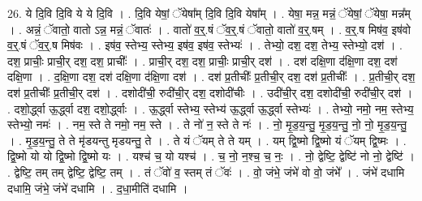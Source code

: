 \documentclass[17pt]{extarticle}
\begin{document}
26. ये दि॒वि दि॒वि ये ये दि॒वि । . दि॒वि येषां॒ ॅयेषा᳚म् दि॒वि दि॒वि येषा᳚म् । . येषा॒ मन्न॒ मन्नं॒ ॅयेषां॒ ॅयेषा॒ मन्न᳚म् । . अन्नं॒ ॅवातो॒ वातो ऽन्न॒ मन्नं॒ ॅवातः॑ । . वातो॑ व॒र्॒.षं ॅव॒र्॒.षं ॅवातो॒ वातो॑ व॒र्॒.षम् । . व॒र्॒.ष मिष॑व॒ इष॑वो व॒र्॒.षं ॅव॒र्॒.ष मिष॑वः । . इष॑व॒ स्तेभ्य॒ स्तेभ्य॒ इष॑व॒ इष॑व॒ स्तेभ्यः॑ । . तेभ्यो॒ दश॒ दश॒ तेभ्य॒ स्तेभ्यो॒ दश॑ । . दश॒ प्राचीः॒ प्राची॒र् दश॒ दश॒ प्राचीः᳚ । . प्राची॒र् दश॒ दश॒ प्राचीः॒ प्राची॒र् दश॑ । . दश॑ दक्षि॒णा द॑क्षि॒णा दश॒ दश॑ दक्षि॒णा । . द॒क्षि॒णा दश॒ दश॑ दक्षि॒णा द॑क्षि॒णा दश॑ । . दश॑ प्र॒तीचीः᳚ प्र॒तीची॒र् दश॒ दश॑ प्र॒तीचीः᳚ । . प्र॒तीची॒र् दश॒ दश॑ प्र॒तीचीः᳚ प्र॒तीची॒र् दश॑ । . दशोदी॑ची॒ रुदी॑ची॒र् दश॒ दशोदी॑चीः । . उदी॑ची॒र् दश॒ दशोदी॑ची॒ रुदी॑ची॒र् दश॑ । . दशो॒र्द्ध्वा ऊ॒र्द्ध्वा दश॒ दशो॒र्द्ध्वाः । . ऊ॒र्द्ध्वा स्तेभ्य॒ स्तेभ्य॑ ऊ॒र्द्ध्वा ऊ॒र्द्ध्वा स्तेभ्यः॑ । . तेभ्यो॒ नमो॒ नम॒ स्तेभ्य॒ स्तेभ्यो॒ नमः॑ । . नम॒ स्ते ते नमो॒ नम॒ स्ते । . ते नो॑ न॒ स्ते ते नः॑ । . नो॒ मृ॒ड॒य॒न्तु॒ मृ॒ड॒य॒न्तु॒ नो॒ नो॒ मृ॒ड॒य॒न्तु॒ । . मृ॒ड॒य॒न्तु॒ ते ते मृ॑डयन्तु मृडयन्तु॒ ते । . ते यं ॅयम् ते ते यम् । . यम् द्वि॒ष्मो द्वि॒ष्मो यं ॅयम् द्वि॒ष्मः । . द्वि॒ष्मो यो यो द्वि॒ष्मो द्वि॒ष्मो यः । . यश्च॑ च॒ यो यश्च॑ । . च॒ नो॒ न॒श्च॒ च॒ नः॒ । . नो॒ द्वेष्टि॒ द्वेष्टि॑ नो नो॒ द्वेष्टि॑ । . द्वेष्टि॒ तम् तम् द्वेष्टि॒ द्वेष्टि॒ तम् । . तं ॅवो॑ व॒ स्तम् तं ॅवः॑ । . वो॒ जंभे॒ जंभे॑ वो वो॒ जंभे᳚ । . जंभे॑ दधामि दधामि॒ जंभे॒ जंभे॑ दधामि । . द॒धा॒मीति॑ दधामि । \newline
\end{document}
